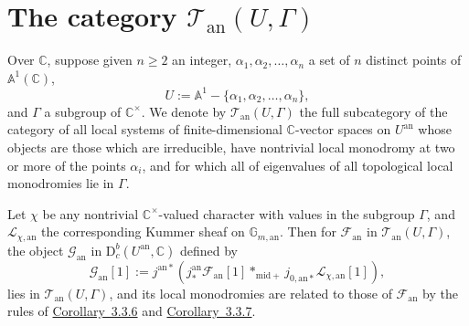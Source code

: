\section{The category
\texorpdfstring{\(\mathcal{T}_{\mathrm{an}}(U,\Gamma)\)}{T an(U,Gamma)}}\label{sec:5.10}

Over \(\mathbb{C}\), suppose given \(n\geq 2\) an integer,
\(\alpha_1,\alpha_2,\ldots,\alpha_n\) a set of \(n\) distinct points of
\(\mathbb{A}^1(\mathbb{C})\),
\[
  U:=\mathbb{A}^1-\{\alpha_1,\alpha_2,\ldots,\alpha_n\},
\]
and \(\Gamma\) a subgroup of \(\mathbb{C}^\times\). We denote by
\(\mathcal{T}_{\mathrm{an}}(U,\Gamma)\) the full subcategory of the category of
all local systems of finite-dimensional \(\mathbb{C}\)-vector spaces on
\(U^{\mathrm{an}}\) whose objects are those which are irreducible, have
nontrivial local monodromy at two or more of the points \(\alpha_i\), and for
which all of eigenvalues of all topological local monodromies lie in
\(\Gamma\).

Let \(\chi\) be any nontrivial \(\mathbb{C}^\times\)-valued character with
values in the subgroup \(\Gamma\), and \(\mathcal{L}_{\chi,\mathrm{an}}\) the
corresponding Kummer sheaf on \(\mathbb{G}_{m,\mathrm{an}}\). Then for
\(\mathcal{F}_{\mathrm{an}}\) in \(\mathcal{T}_{\mathrm{an}}(U,\Gamma)\), the
object \(\mathcal{G}_{\mathrm{an}}\) in
\(\mathrm{D}^b_c(U^{\mathrm{an}},\mathbb{C})\) defined by
\[
  \mathcal{G}_{\mathrm{an}}[1]:=
  j^{\mathrm{an}*}(j^{\mathrm{an}}_*\mathcal{F}_{\mathrm{an}}[1]*_{\mathrm{mid}+}
  j_{0,\mathrm{an}*}\mathcal{L}_{\chi,\mathrm{an}}[1]),
\]
lies in \(\mathcal{T}_{\mathrm{an}}(U,\Gamma)\), and its local monodromies are
related to those of \(\mathcal{F}_{\mathrm{an}}\) by the rules of
\hyperref[cor:3.3.6]{Corollary~3.3.6} and
\hyperref[cor:3.3.7]{Corollary~3.3.7}.

